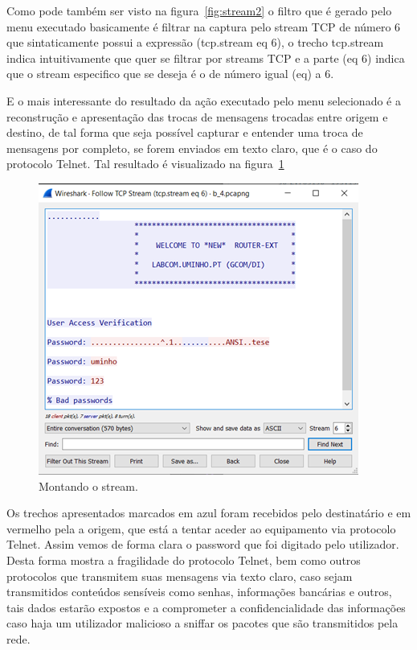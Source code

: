 \documentclass{llncs}
\begin{document}
\begin{enumerate}[\textbf{c)}]
    \begin{flushleft}
      \par Como pode também ser visto na figura~\ref{fig:stream2} o filtro que é gerado pelo menu executado basicamente é filtrar na captura pelo stream TCP de número 6 que sintaticamente possui a expressão (tcp.stream eq 6), o trecho tcp.stream indica intuitivamente que quer se filtrar por streams TCP e a parte (eq 6) indica que o stream especifico que se deseja é o de número igual (eq) a 6.
      \par E o mais interessante do resultado da ação executado pelo menu selecionado é a reconstrução e apresentação das trocas de mensagens trocadas entre origem e destino, de tal forma que seja possível capturar e entender uma troca de mensagens por completo, se forem enviados em texto claro, que é o caso do protocolo Telnet. Tal resultado é visualizado na figura~\ref{fig:followstream}
      \begin{figure}[h]
        \includegraphics[scale=0.65]{followstream.png}
        \centering
        \caption{Montando o stream.}
        \label{fig:followstream}
      \end{figure}
    \end{flushleft}

    \begin{flushleft}
      \par Os trechos apresentados marcados em azul foram recebidos pelo destinatário e em vermelho pela a origem, que está a tentar aceder ao equipamento via protocolo Telnet. Assim vemos de forma clara o password que foi digitado pelo utilizador. Desta forma mostra a fragilidade do protocolo Telnet, bem como outros protocolos que transmitem suas mensagens via texto claro, caso sejam transmitidos conteúdos sensíveis como senhas, informações bancárias e outros, tais dados estarão expostos e a comprometer a confidencialidade das informações caso haja um utilizador malicioso a sniffar os pacotes que são transmitidos pela rede.
    \end{flushleft}
  \end{enumerate}
\end{document}
